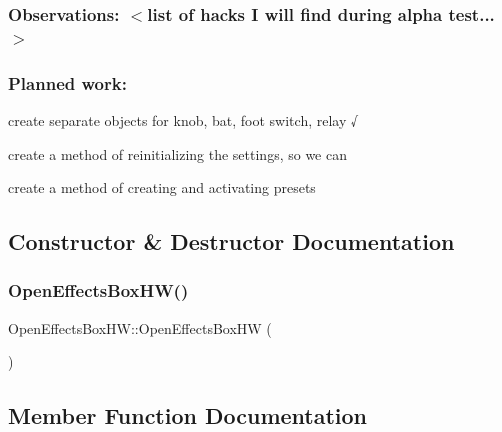 \subsubsection*{Observations\+: $<$list of hacks I will find during alpha test...$>$}

\subsubsection*{Planned work\+:}


\begin{DoxyItemize}
\item create separate objects for knob, bat, foot switch, relay √
\item create a method of reinitializing the settings, so we can
\begin{DoxyItemize}
\item create a method of creating and activating presets 
\end{DoxyItemize}
\end{DoxyItemize}

\subsection{Constructor \& Destructor Documentation}
\mbox{\label{class_open_effects_box_h_w_a5cfe531f432bc672dd08b45568bb09ec}} 
\subsubsection{\texorpdfstring{Open\+Effects\+Box\+H\+W()}{OpenEffectsBoxHW()}}
{\footnotesize\ttfamily Open\+Effects\+Box\+H\+W\+::\+Open\+Effects\+Box\+HW (\begin{DoxyParamCaption}{ }\end{DoxyParamCaption})}



\subsection{Member Function Documentation}
\mbox{\label{class_open_effects_box_h_w_ac070397f7c596522c83c7ff1d540e2df}} 
